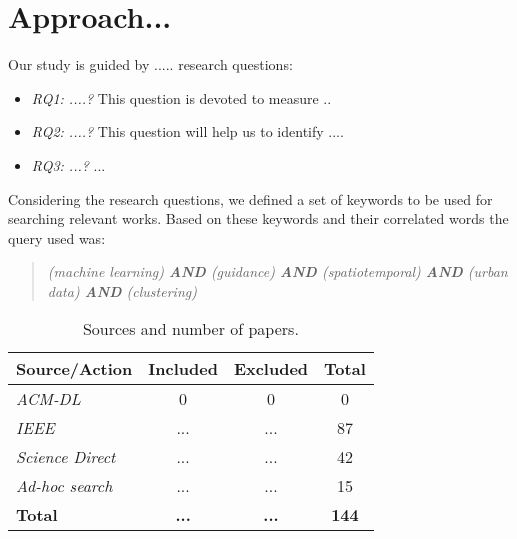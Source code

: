 \documentclass[runningheads,a4paper]{llncs}
\begin{document}


\vspace{-5pt}
\section{Approach...}


Our study is guided by ..... research questions:

\begin{itemize}
\item {\em RQ1: ....?} This question is devoted to measure ..

\item {\em RQ2: ....?} This question will help us to identify ....
 
\item  {\em RQ3: ...?} ...
\end{itemize} 


 Considering the research questions, we defined a set of keywords to be used for
searching relevant works. Based on these keywords and their
 correlated words the query used was:        
%  
 \begin{quote} \sl
 \qquad  (machine learning) \textbf{AND}  (guidance) \textbf{AND}   (spatiotemporal) \textbf{AND}  (urban data) \textbf{AND}   (clustering) 
 \end{quote}

% 
\begin{table}\centering
 \begin{tabular}{|l|c|c|c|} \hline
 \textbf{Source/Action}	& \textbf{Included}	& \textbf{Excluded}	& \textbf{Total}	\\ \hline
 \textit{ACM-DL}				& 0								& 0							& 0						\\ \hline
 \textit{IEEE}						& ...								& ...								& 87					\\ \hline
 \textit{Science Direct}	& ...								& ...							& 42					\\ \hline
  \textit{Ad-hoc search}	& ...								& ...							& 15					\\ \hline
 \textbf{Total}					& \textbf{...}			& \textbf{...}			& \textbf{144}	\\ \hline
 \end{tabular}
 \caption{\label{table:Sources}Sources and number of papers.}
 \end{table}
 
\end{document}
